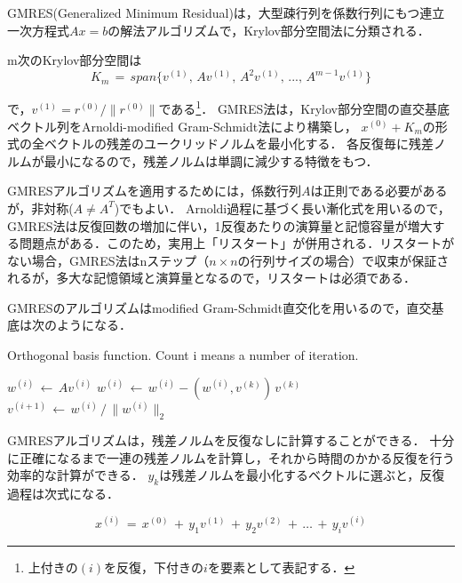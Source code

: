 GMRES(Generalized Minimum Residual)は，大型疎行列を係数行列にもつ連立一次方程式$A x = b$の解法アルゴリズムで，Krylov部分空間法に分類される．


m次のKrylov部分空間は
\begin{equation}
\displaystyle{ K_m \,=\, span \{ v^{(1)},\, Av^{(1)},\, A^2 v^{(1)},\, ...,\, A^{m-1} v^{(1)} \} }
\label{eq:subspace}
\end{equation}

\noindent で，$v^{(1)}=r^{(0)}/\|r^{(0)}\|$である\footnote{上付きの$(i)$を反復，下付きの$i$を要素として表記する．}．
GMRES法は，Krylov部分空間の直交基底ベクトル列をArnoldi-modified Gram-Schmidt法により構築し，
$x^{(0)}+K_m$の形式の全ベクトルの残差のユークリッドノルムを最小化する．
各反復毎に残差ノルムが最小になるので，残差ノルムは単調に減少する特徴をもつ．

GMRESアルゴリズムを適用するためには，係数行列$A$は正則である必要があるが，非対称($A \neq A^T$)でもよい．
Arnoldi過程に基づく長い漸化式を用いるので，GMRES法は反復回数の増加に伴い，1反復あたりの演算量と記憶容量が増大する問題点がある．このため，実用上「リスタート」が併用される．リスタートがない場合，GMRES法はnステップ（$n \times n$の行列サイズの場合）で収束が保証されるが，多大な記憶領域と演算量となるので，リスタートは必須である．

\vspace{3mm}
GMRESのアルゴリズムはmodified Gram-Schmidt直交化を用いるので，直交基底は次のようになる\cite{bahi:07}．

\begin{algorithm}
\caption{Orthogonal basis function. Count i means a number of iteration.}
\label{algo:GS-ortho}
\begin{algorithmic}

\State $w^{(i)} \,\gets \, A v^{(i)}$
\State $w^{(i)} \,\gets \, w^{(i)} - (w^{(i)}, v^{(k)})\, v^{(k)}$
\EndFor
\State $v^{(i+1)} \,\gets \, w^{(i)} \,/\, \|w^{(i)}\|_2$

\end{algorithmic}
\end{algorithm}


GMRESアルゴリズムは，残差ノルムを反復なしに計算することができる．
十分に正確になるまで一連の残差ノルムを計算し，それから時間のかかる反復を行う効率的な計算ができる．
$y_k$は残差ノルムを最小化するベクトルに選ぶと，反復過程は次式になる．

\begin{equation}
x^{(i)} \,=\, x^{(0)} \,+\, y_1 v^{(1)} \,+\, y_2 v^{(2)} \,+\, \dots \,+\, y_i v^{(i)}
\label{eq:GMRES iteration}
\end{equation}


